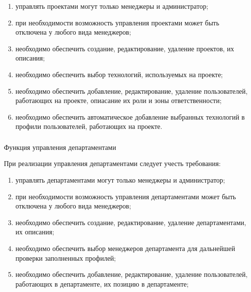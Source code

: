 \begin{enumerate}
	\item управлять проектами могут только менеджеры и администратор;
	\item при необходимости возможность управления проектами может быть отключена у любого вида менеджеров;
  \item необходимо обеспечить создание, редактирование, удаление проектов, их описания;
  \item необходимо обеспечить выбор технологий, используемых на проекте;
  \item необходимо обеспечить добавление, редактирование, удаление пользователей, работающих на проекте, опиасание их
  роли и зоны ответственности;
  \item необходимо обеспечить автоматическое добавление выбранных технологий в профили пользователей, работающих на
  проекте.
\end{enumerate}

\subsubsection{} Функция управления департаментами
\label{sec:domain:specification:departments}

При реализации управления департаментами следует учесть требования:

\begin{enumerate}
	\item управлять департаментами могут только менеджеры и администратор;
	\item при необходимости возможность управления департаментами может быть отключена у любого вида менеджеров;
  \item необходимо обеспечить создание, редактирование, удаление департаментами, их описания;
  \item необходимо обеспечить выбор менеджеров департамента для дальнейшей проверки заполненных профилей;
  \item необходимо обеспечить добавление, редактирование, удаление пользователей, работающих в департаменте, их позицию
  в департаменте;
\end{enumerate}

